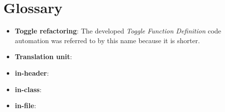 \chapter{Glossary}
\thispagestyle{fancy}

\begin{itemize}
\item \textbf{Toggle refactoring}: The developed \textit{Toggle Function Definition} code automation was referred to by this name because it is shorter.
\item \textbf{Translation unit}:
\item \textbf{in-header}:
\item \textbf{in-class}:
\item \textbf{in-file}:
\end{itemize}

